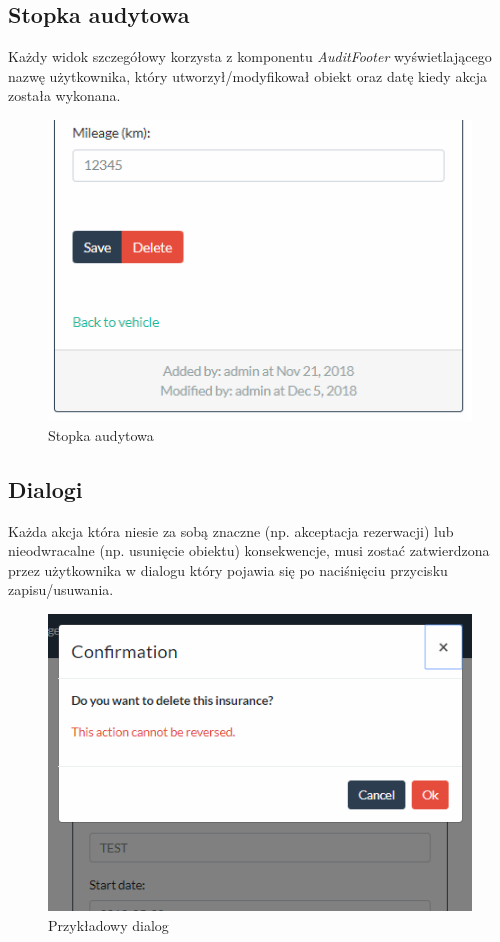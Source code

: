 \documentclass[eng,printmode,openany]{mgr}
\begin{document}
	\newpage
	\subsection{Stopka audytowa}
	Każdy widok szczegółowy korzysta z komponentu \textit{AuditFooter} wyświetlającego nazwę użytkownika, który utworzył/modyfikował obiekt oraz datę kiedy akcja została wykonana.
	
	\begin{figure}[H]
		\centering
		\includegraphics[scale=0.5]{images/insurance_footer.png}
		\caption{Stopka audytowa}
	\end{figure}
	
	\subsection{Dialogi}
	Każda akcja która niesie za sobą znaczne (np. akceptacja rezerwacji) lub nieodwracalne (np. usunięcie obiektu) konsekwencje, musi zostać zatwierdzona przez użytkownika w dialogu który pojawia się po naciśnięciu przycisku zapisu/usuwania.
	
	\begin{figure}[H]
		\centering
		\includegraphics[scale=0.7]{images/insurance_confirmation.png}
		\caption{Przykładowy dialog}
	\end{figure}
	
\end{document}
